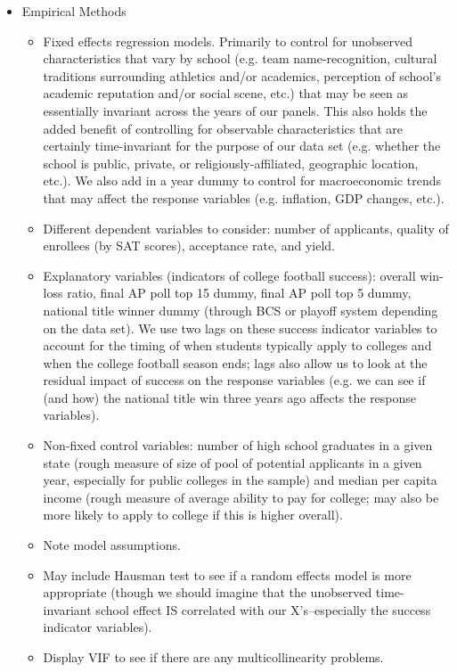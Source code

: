 \documentclass[12pt,english]{article}
\begin{document}
\begin{itemize}
\begin{itemize}
    \end{itemize}
\item Empirical Methods
    \begin{itemize}
    \item Fixed effects regression models. Primarily to control for unobserved characteristics that vary by school (e.g. team name-recognition, cultural traditions surrounding athletics and/or academics, perception of school's academic reputation and/or social scene, etc.) that may be seen as essentially invariant across the years of our panels. This also holds the added benefit of controlling for observable characteristics that are certainly time-invariant for the purpose of our data set (e.g. whether the school is public, private, or religiously-affiliated, geographic location, etc.). We also add in a year dummy to control for macroeconomic trends that may affect the response variables (e.g. inflation, GDP changes, etc.).
    \item Different dependent variables to consider: number of applicants, quality of enrollees (by SAT scores), acceptance rate, and yield. 
    \item Explanatory variables (indicators of college football success): overall win-loss ratio, final AP poll top 15 dummy, final AP poll top 5 dummy, national title winner dummy (through BCS or playoff system depending on the data set). We use two lags on these success indicator variables to account for the timing of when students typically apply to colleges and when the college football season ends; lags also allow us to look at the residual impact of success on the response variables (e.g. we can see if (and how) the national title win three years ago affects the response variables).
    \item Non-fixed control variables: number of high school graduates in a given state (rough measure of size of pool of potential applicants in a given year, especially for public colleges in the sample) and median per capita income (rough measure of average ability to pay for college; may also be more likely to apply to college if this is higher overall).
    \item Note model assumptions.
    \item May include Hausman test to see if a random effects model is more appropriate (though we should imagine that the unobserved time-invariant school effect IS correlated with our X's--especially the success indicator variables).
    \item Display VIF to see if there are any multicollinearity problems.

\end{itemize}
\end{itemize}
\end{document}
